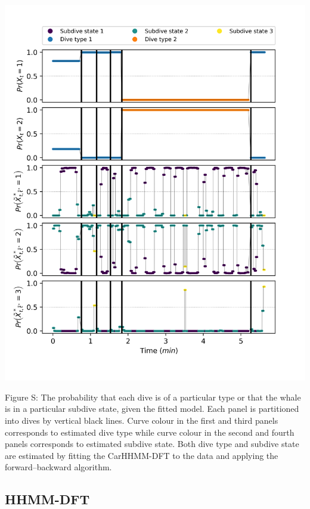 \documentclass{article}
\begin{document}
        \begin{center}
        \includegraphics[width=6in]{../Plots/2019/20190902-182840-CATs_OB_1_0_267_CarHHMM2_decoded_states.png}
        \end{center}
        
        \noindent Figure S: The probability that each dive is of a particular type or that the whale is in a particular subdive state, given the fitted model. Each panel is partitioned into dives by vertical black lines. Curve colour in the first and third panels corresponds to estimated dive type while curve colour in the second and fourth panels corresponds to estimated subdive state. Both dive type and subdive state are estimated by fitting the CarHHMM-DFT to the data and applying the forward--backward algorithm.
        \addtocounter{fignum}{1}
        
        \subsection{HHMM-DFT}
        
\end{document}
